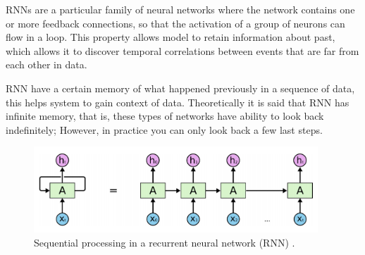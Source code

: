 \vspace{5mm} %

RNNs are a particular family of neural networks where the network contains one or more feedback connections, so that the activation of a group of neurons can flow in a loop. This property allows model to retain information about past, which allows it to discover temporal correlations between events that are far from each other in data.

\vspace{5mm} %

RNN have a certain memory of what happened previously in a sequence of data, this helps system to gain context of data. Theoretically it is said that RNN has infinite memory, that is, these types of networks have ability to look back indefinitely; However, in practice you can only look back a few last steps.

\begin{figure}[h!]
  \begin{center}	\includegraphics[width=0.95\textwidth, frame]{imagenes/Cap4/rnn}
  \caption{Sequential processing in a recurrent neural network (RNN) \protect\cite{Reference53}.}
  \label{fig:rnn}
  \end{center}
\end{figure}


